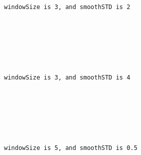 \documentclass[11pt]{article}
\begin{document}
    \begin{center}
    \end{center}
    { \hspace*{\fill} \\}
    
    \begin{Verbatim}[commandchars=\\\{\}]


windowSize is 3, and smoothSTD is 2

    \end{Verbatim}

    \begin{center}
    \end{center}
    { \hspace*{\fill} \\}
    
    \begin{center}
    \end{center}
    { \hspace*{\fill} \\}
    
    \begin{Verbatim}[commandchars=\\\{\}]


windowSize is 3, and smoothSTD is 4

    \end{Verbatim}

    \begin{center}
    \end{center}
    { \hspace*{\fill} \\}
    
    \begin{center}
    \end{center}
    { \hspace*{\fill} \\}
    
    \begin{Verbatim}[commandchars=\\\{\}]


windowSize is 5, and smoothSTD is 0.5

    \end{Verbatim}
\end{document}
